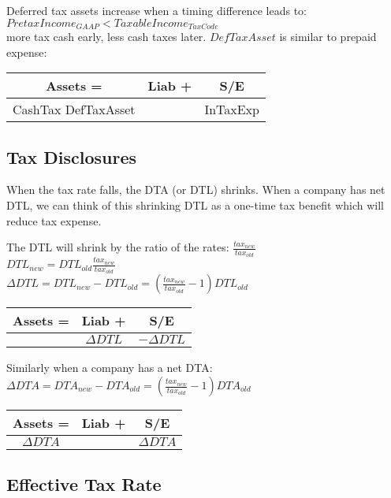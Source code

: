 Deferred tax assets increase when a timing difference leads to: \\
 $PretaxIncome_{GAAP}<Taxable Income_{TaxCode}	$ \\
more tax cash early, less cash taxes later.  $DefTaxAsset$ is similar to prepaid expense:
 
\begin{tabular}{ |c||c|c| } 
	\hline
	Assets = & Liab +  & S/E	 \\ 
	\hline
	CashTax  DefTaxAsset &  & InTaxExp	 \\ 
	
	\hline
\end{tabular}   

\subsection*{ Tax Disclosures}

When the tax rate falls, the  DTA (or DTL) shrinks. When a company has net DTL, we can think of this shrinking DTL as a one-time tax benefit which will reduce tax expense.

The DTL will shrink by the ratio of the rates:  $\frac{tax_{new}}{tax_{old}}$ \\

$ DTL_{new} = DTL _{old} \frac{tax_{new}}{tax_{old}} $ \\

$ \Delta DTL = DTL_{new} - DTL_{old} = (\frac{tax_{new}}{tax_{old}}-1)DTL_{old}$

 
\begin{tabular}{ |c||c|c| } 
	\hline
	Assets = & Liab +  & S/E	 \\ 
	\hline
	& $\Delta DTL$ &   $-\Delta DTL$	 \\ 
	
	\hline
\end{tabular}   

Similarly when a company has a net DTA: \\

$ \Delta DTA = DTA_{new} - DTA_{old} = (\frac{tax_{new}}{tax_{old}}-1)DTA_{old}$


\begin{tabular}{ |c||c|c| } 
	\hline
	Assets = & Liab +  & S/E	 \\ 
	\hline
	 $\Delta DTA$ &  & $\Delta DTA$	 \\ 
	
	\hline
\end{tabular} 

\subsection*{ Effective Tax Rate}

